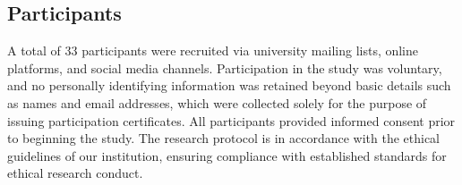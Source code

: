 \subsection{\textbf{Participants}}

A total of 33 participants were recruited via university mailing lists, online platforms, and social media channels. Participation in the study was voluntary, and no personally identifying information was retained beyond basic details such as names and email addresses, which were collected solely for the purpose of issuing participation certificates. All participants provided informed consent prior to beginning the study. The research protocol is in accordance with the ethical guidelines of our institution, ensuring compliance with established standards for ethical research conduct.